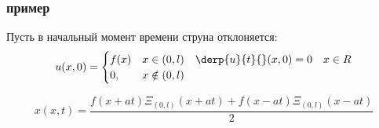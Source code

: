 		\subsubsection{пример}
		Пусть в начальный момент времени струна отклоняется:\\
		\[
			u(x, 0) = \begin{cases} f(x) & x \in (0, l) \quad \derp{u}{t}{} (x, 0) = 0 \quad x \in R\\
								 0, & x \notin (0, l)
				   \end{cases}
		\]

		\[
			x(x, t) = \frac{f(x +at) \Xi_{(0,l)} (x + at) + f(x - at) \Xi_{(0,l)} (x - at)}{2}
		\]
		

		